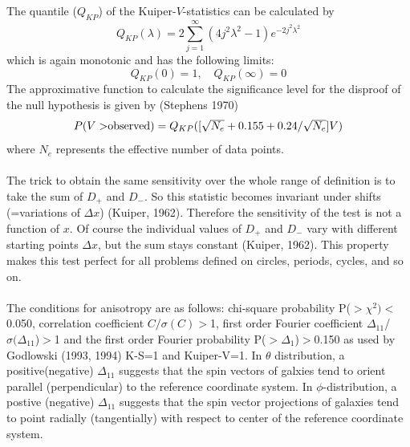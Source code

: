 The quantile ($Q_{KP}$) of the Kuiper-$V$-statistics can be
calculated by
\begin{equation}
    Q_{KP}(\lambda)=2\sum_{j=1}^{\infty}(4j^2\lambda^2-1)e^{-2j^2\lambda^2}
\end{equation}
which is again monotonic and has the following limits:
\begin{equation}
    Q_{KP}(0)=1, \quad Q_{KP}(\infty)=0
\end{equation}
The approximative function to calculate the significance level for
the disproof of the null hypothesis is given by (Stephens 1970)
\begin{equation}
    P(V>$observed$)=Q_{KP}([\sqrt{N_e}+0.155+0.24/\sqrt{N_e}]V)
\end{equation}
where $N_e$ represents the effective number of data points.\\\\
The trick to obtain the same sensitivity over the whole range of
definition is to take the sum of $D_+$ and $D_-$. So this
statistic becomes invariant under shifts (=variations of $\Delta
x$) (Kuiper, 1962). Therefore the sensitivity of the test is not a
function of $x$. Of course the individual values of $D_+$ and
$D_-$ vary with different starting points $\Delta x$, but the sum
stays constant (Kuiper, 1962). This property makes this test
perfect for all problems defined on circles, periods, cycles, and
so on.\\\\
The conditions for anisotropy are as follows:
chi-square probability P($>\chi^2)<$0.050, correlation
coefficient $C/\sigma(C)>$1, first order Fourier coefficient
$\Delta_{11}$/$\sigma(\Delta_{11}$)$>$1 and the first order
Fourier probability P($>\Delta_1$)$>$0.150 as used by Godlowski
(1993, 1994) K-S=1 and Kuiper-V=1. In $\theta$ distribution, a positive(negative) $\Delta_{11}$ suggests that the spin vectors of galxies tend to orient parallel  (perpendicular) to the reference coordinate system. In $\phi$-distribution, a postive (negative) $\Delta_{11}$ suggests that the spin vector projections of galaxies tend to point radially (tangentially) with respect to center of the reference coordinate system.
